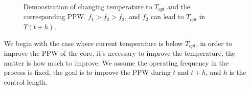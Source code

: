 \begin{figure}
  \centering
  \caption{Demonstration of changing temperature to $T_{opt}$ and the corresponding PPW. $f_{1}>f_{2}>f_{3}$, and $f_{2}$ can lead to $T_{opt}$ in $T(t+h)$.}
  \label{fig:ppw_transient}
\end{figure}


We begin with the case where current temperature is below $T_{opt}$, in order to improve the PPW of the core, it's necessary to improve the temperature, the matter is how much to improve. We assume the operating frequency in the process is fixed, the goal is to improve the PPW during $t$ and $t+h$, and $h$ is the control length. 


